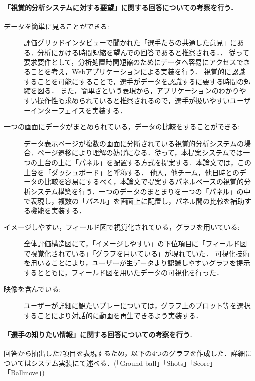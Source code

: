\documentclass[sotsuron]{kuee}
\begin{document}
					\paragraph {「視覚的分析システムに対する要望」に関する回答についての考察を行う．}
						\begin{description}
							\item [データを簡単に見ることができる:]
							評価グリッドインタビューで聞かれた「選手たちの共通した意見」にある，分析にかける時間短縮を望んでの回答であると推察される．．
							従って要求要件として，分析処置時間短縮のためにデータへ容易にアクセスできることを考え，Webアプリケーションによる実装を行う．
							視覚的に認識することを可能にすることで，選手がデータを認識するに要する時間の短縮を図る．
							また，簡単さという表現から，アプリケーションのわかりやすい操作性も求められていると推察されるので，選手が扱いやすいユーザーインターフェイスを実装する．
							
							\item [一つの画面にデータがまとめられている，データの比較をすることができる:]
							データ表示ページが複数の画面に分断されている視覚的分析システムの場合，ページ遷移により理解の妨げになる．従って，本提案システムでは一つの土台の上に「パネル」を配置する方式を提案する．本論文では，この土台を「ダッシュボード」と呼称する．
							他人，他チーム，他日時とのデータの比較を容易にするべく，本論文で提案するパネルベースの視覚的分析システム構築を行う．一つのデータのまとまりを一つの「パネル」の中で表現し，複数の「パネル」を画面上に配置し，パネル間の比較を補助する機能を実装する．
							
							\item [イメージしやすい，フィールド図で視覚化されている，グラフを用いている:]
							全体評価構造図にて，「イメージしやすい」の下位項目に「フィールド図で視覚化されている」「グラフを用いている」が現れていた．
							可視化技術を用いることにより，ユーザーが生データより認識しやすいグラフを提示するとともに，フィールド図を用いたデータの可視化を行った．
							
							\item [映像を含んでいる:]
							ユーザーが詳細に観たいプレーについては，グラフ上のプロット等を選択することにより対話的に動画を再生できるよう実装する．
						\end{description}
					\paragraph {「選手の知りたい情報」に関する回答についての考察を行う．}
						回答から抽出した7項目を表現するため，以下の4つのグラフを作成した．詳細についてはシステム実装にて述べる．(「Ground ball」「Shots」「Score」「Ballmove」)
\end{document}
